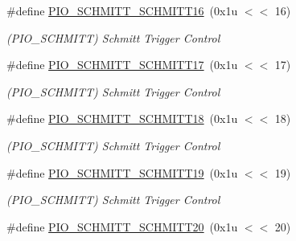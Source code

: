 \begin{DoxyCompactItemize}
\mbox{\label{group__SAMS70__PIO_ga5c4cb6edb45581d38eab0468b8905b9c}} 
\#define \mbox{\hyperlink{group__SAMS70__PIO_ga5c4cb6edb45581d38eab0468b8905b9c}{P\+I\+O\+\_\+\+S\+C\+H\+M\+I\+T\+T\+\_\+\+S\+C\+H\+M\+I\+T\+T16}}~(0x1u $<$$<$ 16)
\begin{DoxyCompactList}\small\item\em (P\+I\+O\+\_\+\+S\+C\+H\+M\+I\+TT) Schmitt Trigger Control \end{DoxyCompactList}\item 
\mbox{\label{group__SAMS70__PIO_ga138be05893f9b96844d973de41e6de55}} 
\#define \mbox{\hyperlink{group__SAMS70__PIO_ga138be05893f9b96844d973de41e6de55}{P\+I\+O\+\_\+\+S\+C\+H\+M\+I\+T\+T\+\_\+\+S\+C\+H\+M\+I\+T\+T17}}~(0x1u $<$$<$ 17)
\begin{DoxyCompactList}\small\item\em (P\+I\+O\+\_\+\+S\+C\+H\+M\+I\+TT) Schmitt Trigger Control \end{DoxyCompactList}\item 
\mbox{\label{group__SAMS70__PIO_ga2bca8d372d1159da7b064b5c0681a2de}} 
\#define \mbox{\hyperlink{group__SAMS70__PIO_ga2bca8d372d1159da7b064b5c0681a2de}{P\+I\+O\+\_\+\+S\+C\+H\+M\+I\+T\+T\+\_\+\+S\+C\+H\+M\+I\+T\+T18}}~(0x1u $<$$<$ 18)
\begin{DoxyCompactList}\small\item\em (P\+I\+O\+\_\+\+S\+C\+H\+M\+I\+TT) Schmitt Trigger Control \end{DoxyCompactList}\item 
\mbox{\label{group__SAMS70__PIO_gaff116da2e1b27c50e008c0ae9cf4b0c2}} 
\#define \mbox{\hyperlink{group__SAMS70__PIO_gaff116da2e1b27c50e008c0ae9cf4b0c2}{P\+I\+O\+\_\+\+S\+C\+H\+M\+I\+T\+T\+\_\+\+S\+C\+H\+M\+I\+T\+T19}}~(0x1u $<$$<$ 19)
\begin{DoxyCompactList}\small\item\em (P\+I\+O\+\_\+\+S\+C\+H\+M\+I\+TT) Schmitt Trigger Control \end{DoxyCompactList}\item 
\mbox{\label{group__SAMS70__PIO_ga71d786a7318afe2c205cf874da861f95}} 
\#define \mbox{\hyperlink{group__SAMS70__PIO_ga71d786a7318afe2c205cf874da861f95}{P\+I\+O\+\_\+\+S\+C\+H\+M\+I\+T\+T\+\_\+\+S\+C\+H\+M\+I\+T\+T20}}~(0x1u $<$$<$ 20)
$$
\end{DoxyCompactItemize}
